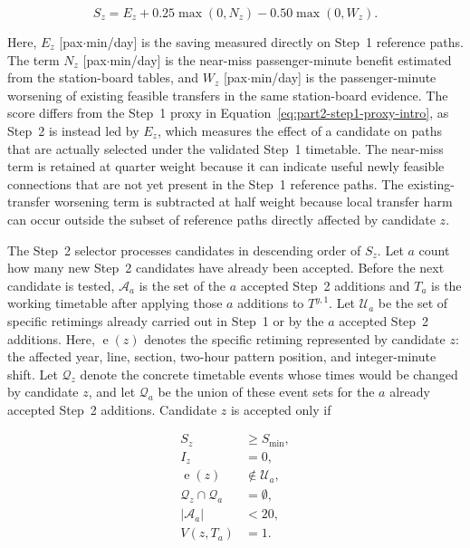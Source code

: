 \documentclass[preprint,12pt]{elsarticle}
\begin{document}
\begin{equation}
S_z
=
E_z
+
0.25\max(0,N_z)
-
0.50\max(0,W_z).
\label{eq:part2-step2-score}
\end{equation}

Here, \(E_z\) [pax\(\cdot\)min/day] is the saving measured directly on Step~1 reference paths. The term \(N_z\) [pax\(\cdot\)min/day] is the near-miss passenger-minute benefit estimated from the station-board tables, and \(W_z\) [pax\(\cdot\)min/day] is the passenger-minute worsening of existing feasible transfers in the same station-board evidence. The score differs from the Step~1 proxy in Equation~\eqref{eq:part2-step1-proxy-intro}, as Step~2 is instead led by \(E_z\), which measures the effect of a candidate on paths that are actually selected under the validated Step~1 timetable. The near-miss term is retained at quarter weight because it can indicate useful newly feasible connections that are not yet present in the Step~1 reference paths. The existing-transfer worsening term is subtracted at half weight because local transfer harm can occur outside the subset of reference paths directly affected by candidate \(z\).

The Step~2 selector processes candidates in descending order of \(S_z\). Let \(a\) count how many new Step~2 candidates have already been accepted. Before the next candidate is tested, \(\mathcal{A}_a\) is the set of the \(a\) accepted Step~2 additions and \(T_a\) is the working timetable after applying those \(a\) additions to \(T^{y,1}\). Let \(\mathcal{U}_a\) be the set of specific retimings already carried out in Step~1 or by the \(a\) accepted Step~2 additions. Here, \(\operatorname{e}(z)\) denotes the specific retiming represented by candidate \(z\): the affected year, line, section, two-hour pattern position, and integer-minute shift. Let \(\mathcal{Q}_z\) denote the concrete timetable events whose times would be changed by candidate \(z\), and let \(\mathcal{Q}_a\) be the union of these event sets for the \(a\) already accepted Step~2 additions. 
\newpage
Candidate \(z\) is accepted only if

\begin{equation}
\begin{aligned}
S_z &\ge S_{\min},\\
I_z &= 0,\\
\operatorname{e}(z) &\notin \mathcal{U}_a,\\
\mathcal{Q}_z\cap\mathcal{Q}_a &= \emptyset,\\
|\mathcal{A}_a| &< 20,\\
V(z,T_a) &= 1.
\end{aligned}
\label{eq:part2-step2-acceptance-rule}
\end{equation}
\end{document}
